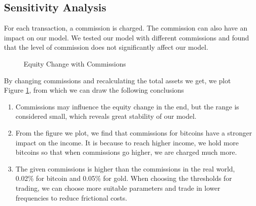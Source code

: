 \documentclass[12pt,a4paper]{article}
\begin{document}
\begin{spacing}{1.2}
\section{Sensitivity Analysis}
\label{SensitivityAnalysis}

For each transaction, a commission is charged. The commission can also have an impact on our model. We tested our model with different commissions and found that the level of commission does not significantly affect our model.

 \begin{figure}[H]
	\caption{Equity Change with Commissions}
	\label{figure:sensitive_test}
\end{figure}

By changing commissions and recalculating the total assets we get, we plot Figure \ref{figure:sensitive_test}, from which we can draw the following conclusions

\begin{enumerate}
	\item Commissions may influence the equity change in the end, but the range is considered small, which reveals great stability of our model.
	
	\item From the figure we plot, we find that commissions for bitcoins have a stronger impact on the income. It is because to reach higher income, we hold more bitcoins so that when commissions go higher, we are charged much more.
	
	\item The given commissions is higher than the commissions in the real world, 0.02\% for bitcoin and 0.05\% for gold. When choosing the thresholds for trading, we can choose more suitable parameters and trade in lower frequencies to reduce frictional costs.
\end{enumerate}


\end{spacing}
\end{document}
